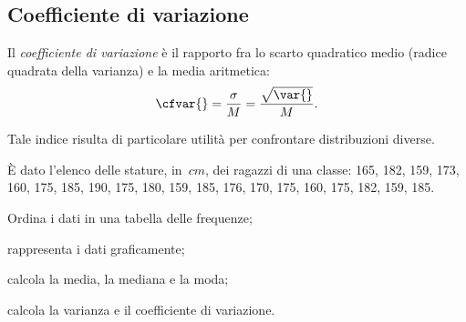 \subsection{Coefficiente di variazione}

\begin{definizione}
Il \emph{coefficiente di variazione} è il rapporto fra lo scarto quadratico medio (radice quadrata
della varianza) e la media aritmetica:
\[\cfvar{} = \frac{\sigma}{M} = \frac{\sqrt{\var{}}}{M}.\]
\end{definizione}

Tale indice risulta di particolare utilità per confrontare distribuzioni diverse.

\begin{exrig}
 \begin{esempio}

È dato l'elenco delle stature, in~$\unit{cm}$, dei ragazzi di
una classe: 165, 182, 159, 173, 160, 175, 185, 190, 175, 180, 159, 185, 176, 170, 175, 160, 175, 182, 159, 185.

\begin{enumeratea}
\item Ordina i dati in una tabella delle frequenze;
\item rappresenta i dati graficamente;
\item calcola la media, la mediana e la moda;
\item calcola la varianza e il coefficiente di variazione.
\end{enumeratea}


\end{esempio}
\end{exrig}
